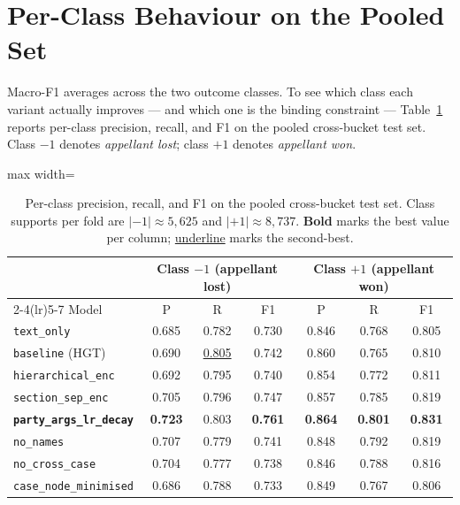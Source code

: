\section{Per-Class Behaviour on the Pooled Set}
\label{sec:per_class_behaviour}

Macro-F1 averages across the two outcome classes. To see which class
each variant actually improves --- and which one is the binding
constraint --- Table~\ref{tab:per_class_pooled} reports per-class
precision, recall, and F1 on the pooled cross-bucket test set. Class
$-1$ denotes \emph{appellant lost}; class $+1$ denotes
\emph{appellant won}.

\begin{table}[H]
  \centering
  \scriptsize
  \setlength{\tabcolsep}{5pt}
  \begin{adjustbox}{max width=\textwidth}
  \begin{tabular}{lcccccc}
    \toprule
    & \multicolumn{3}{c}{Class $-1$ (appellant lost)} & \multicolumn{3}{c}{Class $+1$ (appellant won)} \\
    \cmidrule(lr){2-4}\cmidrule(lr){5-7}
    Model & P & R & F1 & P & R & F1 \\
    \midrule
    \texttt{text\_only}                      & 0.685 & 0.782 & 0.730 & 0.846 & 0.768 & 0.805 \\
    \texttt{baseline} (HGT)                  & 0.690 & \underline{0.805} & 0.742 & 0.860 & 0.765 & 0.810 \\
    \texttt{hierarchical\_enc}               & 0.692 & 0.795 & 0.740 & 0.854 & 0.772 & 0.811 \\
    \texttt{section\_sep\_enc}               & 0.705 & 0.796 & 0.747 & 0.857 & 0.785 & 0.819 \\
    \textbf{\texttt{party\_args\_lr\_decay}} & \textbf{0.723} & 0.803 & \textbf{0.761} & \textbf{0.864} & \textbf{0.801} & \textbf{0.831} \\
    \texttt{no\_names}                       & 0.707 & 0.779 & 0.741 & 0.848 & 0.792 & 0.819 \\
    \texttt{no\_cross\_case}                 & 0.704 & 0.777 & 0.738 & 0.846 & 0.788 & 0.816 \\
    \texttt{case\_node\_minimised}           & 0.686 & 0.788 & 0.733 & 0.849 & 0.767 & 0.806 \\
    \bottomrule
  \end{tabular}
  \end{adjustbox}
  \caption{Per-class precision, recall, and F1 on the pooled
  cross-bucket test set. Class supports per fold are
  $|{-1}|\!\approx\!5{,}625$ and $|{+1}|\!\approx\!8{,}737$.
  \textbf{Bold} marks the best value per column;
  \underline{underline} marks the second-best.}
  \label{tab:per_class_pooled}
\end{table}

